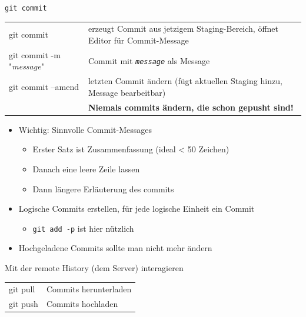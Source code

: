 \begin{frame}{\texttt{git commit}}
  \begin{tabu}{>{\ttfamily}l X[,L]}
    git commit                       & erzeugt Commit aus jetzigem Staging-Bereich, öffnet Editor für Commit-Message \\
    git commit -m "\textit{message}" & Commit mit \texttt{\textit{message}} als Message \\
    git commit --amend               & letzten Commit ändern (fügt aktuellen Staging hinzu, Message bearbeitbar) \\
    & \alert{\bfseries Niemals commits ändern, die schon gepusht sind!}
  \end{tabu}

  \begin{itemize}
    \item Wichtig: Sinnvolle Commit-Messages
      \begin{itemize}
        \item Erster Satz ist Zusammenfassung (ideal < 50 Zeichen)
        \item Danach eine leere Zeile lassen
        \item Dann längere Erläuterung des commits
      \end{itemize}
    \item Logische Commits erstellen, für jede logische Einheit ein Commit
      \begin{itemize}
        \item \texttt{git add -p} ist hier nützlich
      \end{itemize}
    \item Hochgeladene Commits sollte man nicht mehr ändern
  \end{itemize}
\end{frame}



\begin{frame}{Mit der remote History (dem Server) interagieren}
  \begin{tabu}{>{\ttfamily}l X[,L]}
    git pull          & Commits herunterladen \\
    git push          & Commits hochladen
  \end{tabu}
\end{frame}

